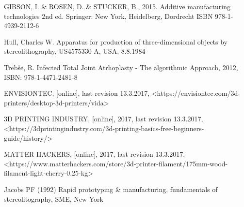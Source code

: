 \documentclass[a4paper, twoside, 11pt]{report}
\begin{document}
\begin{thebibliography}{99}
	GIBSON, I. \& ROSEN, D. \& STUCKER, B.,
	2015.
	Additive manufacturing technologies
	2nd ed.
	Springer:
	New York, Heidelberg, Dordrecht
	ISBN 978-1-4939-2112-6
	
	Hull, Charles W.
	Apparatus for production of three-dimensional objects by stereolithography,
	US4575330 A,
	USA,
	8.8.1984
	
	Trebše, R.
	Infected Total Joint Atrhoplasty - The algorithmic Approach,
	2012,
	ISBN: 978-1-4471-2481-8
	
	ENVISIONTEC,
	[online],
	last revision 13.3.2017,
	<https://envisiontec.com/3d-printers/desktop-3d-printers/vida>
	
	3D PRINTING INDUSTRY,
	[online],
	2017,
	last revision 13.3.2017,
	<https://3dprintingindustry.com/3d-printing-basics-free-beginners-guide/history/>
	
	MATTER HACKERS,
	[online],
	2017,
	last revision 13.3.2017,
	<https://www.matterhackers.com/store/3d-printer-filament/175mm-wood-filament-light-cherry-0.25-kg>
	
	Jacobs PF (1992)
	Rapid prototyping \& manufacturing,
	fundamentals of stereolitography,
	SME,
	New York
	
\end{thebibliography}
\end{document}
